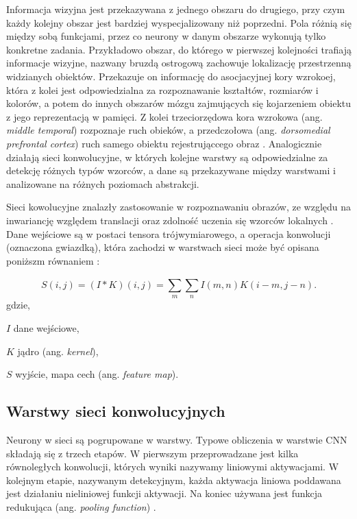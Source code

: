 Informacja wizyjna jest przekazywana z jednego obszaru do drugiego, przy czym każdy kolejny obszar jest bardziej wyspecjalizowany niż poprzedni. Pola różnią się między sobą funkcjami, przez co neurony w danym obszarze wykonują tylko konkretne zadania. Przykładowo obszar, do którego w pierwszej kolejności trafiają informacje wizyjne, nazwany bruzdą ostrogową zachowuje lokalizację przestrzenną widzianych obiektów. Przekazuje on informację do asocjacyjnej kory wzrokoej, która z kolei jest odpowiedzialna za rozpoznawanie kształtów, rozmiarów i kolorów, a potem do innych obszarów mózgu zajmujących się kojarzeniem obiektu z jego reprezentacją w pamięci. Z kolei trzeciorzędowa kora wzrokowa (ang. \textit{middle temporal}) rozpoznaje ruch obieków, a przedczołowa (ang. \textit{dorsomedial prefrontal cortex}) ruch samego obiektu rejestrująccego obraz \cite{cnn_website}. Analogicznie działają sieci konwolucyjne, w których kolejne warstwy są odpowiedzialne za detekcję różnych typów wzorców, a dane są przekazywane między warstwami i analizowane na różnych poziomach abstrakcji.

Sieci kowolucyjne znalazły zastosowanie w rozpoznawaniu obrazów, ze względu na inwariancję względem translacji oraz zdolność uczenia się wzorców lokalnych \cite{Chollet2017DeepLW}. Dane wejściowe są w postaci tensora trójwymiarowego, a operacja konwolucji (oznaczona gwiazdką), która zachodzi w warstwach sieci może być opisana poniższm równaniem \cite{deep_learning}:

\begin{equation}
S(i,j) = (I * K)(i,j) = \sum_{m}^{}\sum_{n}^{} I(m,n)K(i-m,j-n).
\end{equation}
gdzie,
\begin{eqwhere}[2cm]
	\item[$I$] dane wejściowe,
	\item[$K$] jądro (ang. \textit{kernel}),
	\item[$S$] wyjście, mapa cech (ang. \textit{feature map}).
\end{eqwhere}


\subsection{Warstwy sieci konwolucyjnych}

Neurony w sieci są pogrupowane w warstwy. Typowe obliczenia w warstwie CNN składają się z trzech etapów. W pierwszym przeprowadzane jest kilka równoległych konwolucji, których wyniki nazywamy liniowymi aktywacjami. W kolejnym etapie, nazywanym detekcyjnym, każda aktywacja liniowa poddawana jest działaniu nieliniowej funkcji aktywacji. Na koniec używana jest funkcja redukująca (ang. \textit{pooling function}) \cite{deep_learning}.

